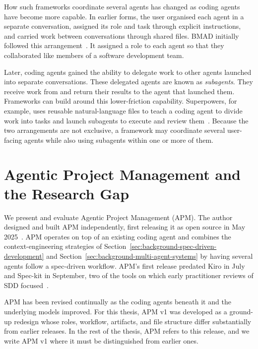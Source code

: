 How such frameworks coordinate several agents has changed as coding agents have become more capable. In earlier forms, the user organised each agent in a separate conversation, assigned its role and task through explicit instructions, and carried work between conversations through shared files. BMAD initially followed this arrangement~\cite{bmad2025method}. It assigned a role to each agent so that they collaborated like members of a software development team.

Later, coding agents gained the ability to delegate work to other agents launched into separate conversations. These delegated agents are known as \emph{subagents}. They receive work from and return their results to the agent that launched them. Frameworks can build around this lower-friction capability. Superpowers, for example, uses reusable natural-language files to teach a coding agent to divide work into tasks and launch subagents to execute and review them~\cite{vincent2025superpowers}. Because the two arrangements are not exclusive, a framework may coordinate several user-facing agents while also using subagents within one or more of them.

\section{Agentic Project Management and the Research Gap}
\label{sec:background-agentic-project-management-and-the-research-gap}

We present and evaluate Agentic Project Management (APM). The author designed and built APM independently, first releasing it as open source in May 2025~\cite{chaidemenos2026apmrepo}. APM operates on top of an existing coding agent and combines the context-engineering strategies of Section~\ref{sec:background-spec-driven-development} and Section~\ref{sec:background-multi-agent-systems} by having several agents follow a spec-driven workflow. APM's first release predated Kiro in July and Spec-kit in September, two of the tools on which early practitioner reviews of SDD focused~\cite{boeckeler2025sdd, thoughtworks2025sdd}.

APM has been revised continually as the coding agents beneath it and the underlying models improved. For this thesis, APM v1 was developed as a ground-up redesign whose roles, workflow, artifacts, and file structure differ substantially from earlier releases. In the rest of the thesis, APM refers to this release, and we write APM v1 where it must be distinguished from earlier ones.

